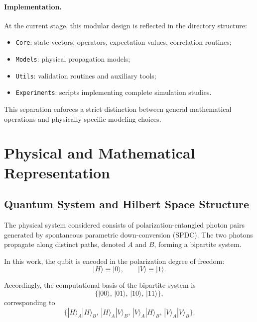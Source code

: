 \documentclass[a4paper]{article}
\begin{document}
\medskip

\paragraph{Implementation.}

At the current stage, this modular design is reflected in the directory structure:
\begin{itemize}
\item \texttt{Core}: state vectors, operators, expectation values, correlation routines;
\item \texttt{Models}: physical propagation models;
\item \texttt{Utils}: validation routines and auxiliary tools;
\item \texttt{Experiments}: scripts implementing complete simulation studies.
\end{itemize}

This separation enforces a strict distinction between general mathematical operations and physically specific modeling choices.



\section{Physical and Mathematical Representation}


\subsection{Quantum System and Hilbert Space Structure}

The physical system considered consists of polarization-entangled photon pairs generated by spontaneous parametric down-conversion (SPDC). The two photons propagate along distinct paths, denoted \(A\) and \(B\), forming a bipartite system.

In this work, the qubit is encoded in the polarization degree of freedom:
\[
|H\rangle \equiv |0\rangle,
\qquad
|V\rangle \equiv |1\rangle.
\]

Accordingly, the computational basis of the bipartite system is
\[
\{
|00\rangle,\,
|01\rangle,\,
|10\rangle,\,
|11\rangle
\},
\]
corresponding to
\[
\{
|H\rangle_A |H\rangle_B,\,
|H\rangle_A |V\rangle_B,\,
|V\rangle_A |H\rangle_B,\,
|V\rangle_A |V\rangle_B
\}.
\]
\end{document}
